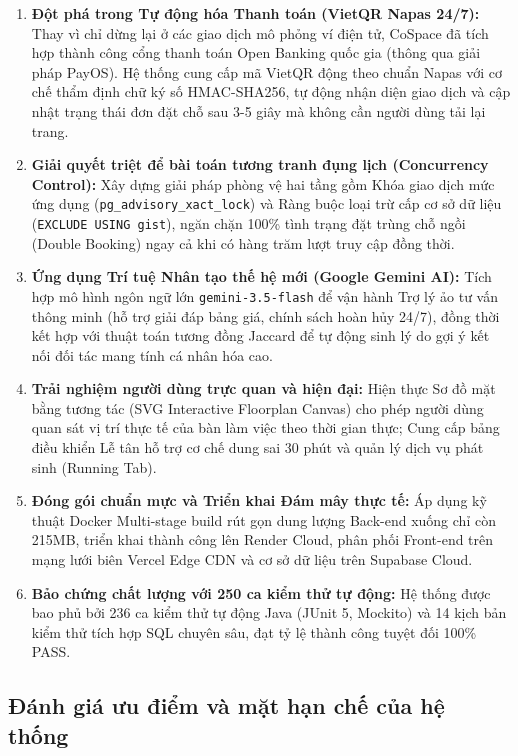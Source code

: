 \begin{enumerate}
    \item \textbf{Đột phá trong Tự động hóa Thanh toán (VietQR Napas 24/7):} Thay vì chỉ dừng lại ở các giao dịch mô phỏng ví điện tử, CoSpace đã tích hợp thành công cổng thanh toán Open Banking quốc gia (thông qua giải pháp PayOS). Hệ thống cung cấp mã VietQR động theo chuẩn Napas với cơ chế thẩm định chữ ký số HMAC-SHA256, tự động nhận diện giao dịch và cập nhật trạng thái đơn đặt chỗ sau 3-5 giây mà không cần người dùng tải lại trang.
    \item \textbf{Giải quyết triệt để bài toán tương tranh đụng lịch (Concurrency Control):} Xây dựng giải pháp phòng vệ hai tầng gồm Khóa giao dịch mức ứng dụng (\texttt{pg\_advisory\_xact\_lock}) và Ràng buộc loại trừ cấp cơ sở dữ liệu (\texttt{EXCLUDE USING gist}), ngăn chặn 100\% tình trạng đặt trùng chỗ ngồi (Double Booking) ngay cả khi có hàng trăm lượt truy cập đồng thời.
    \item \textbf{Ứng dụng Trí tuệ Nhân tạo thế hệ mới (Google Gemini AI):} Tích hợp mô hình ngôn ngữ lớn \texttt{gemini-3.5-flash} để vận hành Trợ lý ảo tư vấn thông minh (hỗ trợ giải đáp bảng giá, chính sách hoàn hủy 24/7), đồng thời kết hợp với thuật toán tương đồng Jaccard để tự động sinh lý do gợi ý kết nối đối tác mang tính cá nhân hóa cao.
    \item \textbf{Trải nghiệm người dùng trực quan và hiện đại:} Hiện thực Sơ đồ mặt bằng tương tác (SVG Interactive Floorplan Canvas) cho phép người dùng quan sát vị trí thực tế của bàn làm việc theo thời gian thực; Cung cấp bảng điều khiển Lễ tân hỗ trợ cơ chế dung sai 30 phút và quản lý dịch vụ phát sinh (Running Tab).
    \item \textbf{Đóng gói chuẩn mực và Triển khai Đám mây thực tế:} Áp dụng kỹ thuật Docker Multi-stage build rút gọn dung lượng Back-end xuống chỉ còn 215MB, triển khai thành công lên Render Cloud, phân phối Front-end trên mạng lưới biên Vercel Edge CDN và cơ sở dữ liệu trên Supabase Cloud.
    \item \textbf{Bảo chứng chất lượng với 250 ca kiểm thử tự động:} Hệ thống được bao phủ bởi 236 ca kiểm thử tự động Java (JUnit 5, Mockito) và 14 kịch bản kiểm thử tích hợp SQL chuyên sâu, đạt tỷ lệ thành công tuyệt đối 100\% PASS.
\end{enumerate}

\subsection{Đánh giá ưu điểm và mặt hạn chế của hệ thống}

